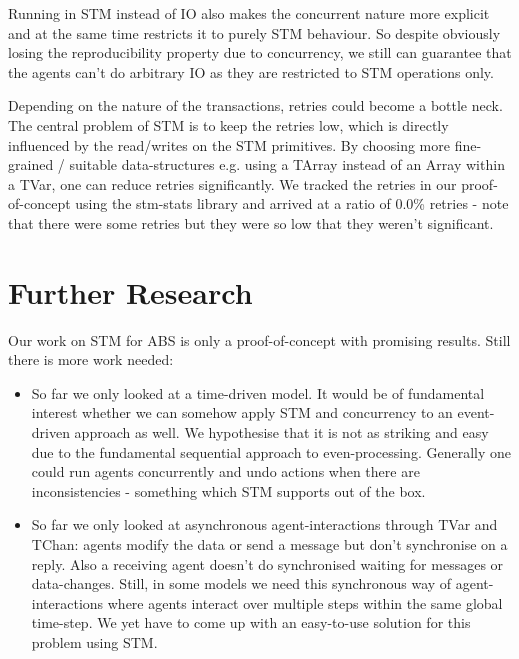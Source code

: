 Running in STM instead of IO also makes the concurrent nature more explicit and at the same time restricts it to purely STM behaviour. So despite obviously losing the reproducibility property due to concurrency, we still can guarantee that the agents can't do arbitrary IO as they are restricted to STM operations only.

Depending on the nature of the transactions, retries could become a bottle neck. The central problem of STM is to keep the retries low, which is directly influenced by the read/writes on the STM primitives. By choosing more fine-grained / suitable data-structures e.g. using a TArray instead of an Array within a TVar, one can reduce retries significantly. We tracked the retries in our proof-of-concept using the stm-stats library and arrived at a ratio of 0.0\% retries - note that there were some retries but they were so low that they weren't significant.

\section{Further Research}
\label{sect:stm_further}
Our work on STM for ABS is only a proof-of-concept with promising results. Still there is more work needed:

\begin{itemize}
	\item So far we only looked at a time-driven model. It would be of fundamental interest whether we can somehow apply STM and concurrency to an event-driven approach as well. We hypothesise that it is not as striking and easy due to the fundamental sequential approach to even-processing. Generally one could run agents concurrently and undo actions when there are inconsistencies - something which STM supports out of the box.
	\item So far we only looked at asynchronous agent-interactions through TVar and TChan: agents modify the data or send a message but don't synchronise on a reply. Also a receiving agent doesn't do synchronised waiting for messages or data-changes. Still, in some models we need this synchronous way of agent-interactions where agents interact over multiple steps within the same global time-step. We yet have to come up with an easy-to-use solution for this problem using STM.
\end{itemize}